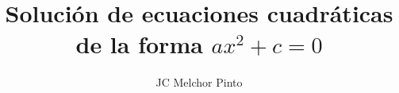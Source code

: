 \documentclass[12pt,addpoints,answers]{guia}
\title{Solución de ecuaciones cuadráticas de la forma $ax^2+c=0$}
\author{JC Melchor Pinto}
\begin{document}
\pagestyle{headandfoot}
\INFO%
\begin{multicols}{2}%
\end{multicols}%
%
\begin{questions}
    \questionboxed[25]{}
    \questionboxed[25]{}
    \questionboxed[25]{}
    \questionboxed[25]{}
\end{questions}
\end{document}
